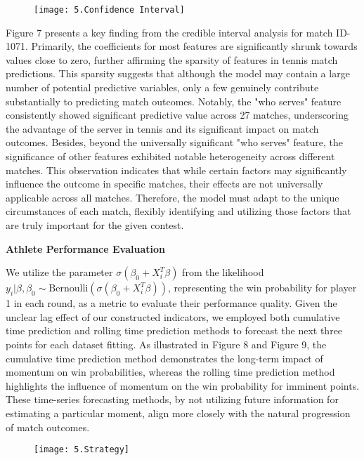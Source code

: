 \documentclass{mcmthesis}
\begin{document}
\begin{figure}[ht]
  \centering
  \texttt{[image: 5.Confidence Interval]}
\end{figure}

Figure 7 presents a key finding from the credible interval analysis for match ID-1071. Primarily, the coefficients for most features are significantly shrunk towards values close to zero, further affirming the sparsity of features in tennis match predictions. This sparsity suggests that although the model may contain a large number of potential predictive variables, only a few genuinely contribute substantially to predicting match outcomes. Notably, the "who serves" feature consistently showed significant predictive value across 27 matches, underscoring the advantage of the server in tennis and its significant impact on match outcomes. Besides, beyond the universally significant "who serves" feature, the significance of other features exhibited notable heterogeneity across different matches. This observation indicates that while certain factors may significantly influence the outcome in specific matches, their effects are not universally applicable across all matches. Therefore, the model must adapt to the unique circumstances of each match, flexibly identifying and utilizing those factors that are truly important for the given contest.

\textbf{Athlete Performance Evaluation}

We utilize the parameter $\sigma(\beta_0 + X_i^T\beta)$ from the likelihood $y_i | \beta, \beta_0 \sim \text{Bernoulli}\left(\sigma(\beta_0 + X_i^T\beta)\right)$, representing the win probability for player 1 in each round, as a metric to evaluate their performance quality. Given the unclear lag effect of our constructed indicators, we employed both cumulative time prediction and rolling time prediction methods to forecast the next three points for each dataset fitting. As illustrated in Figure 8 and Figure 9, the cumulative time prediction method demonstrates the long-term impact of momentum on win probabilities, whereas the rolling time prediction method highlights the influence of momentum on the win probability for imminent points. These time-series forecasting methods, by not utilizing future information for estimating a particular moment, align more closely with the natural progression of match outcomes.
\begin{figure}[ht]
  \small
  \centering
  \texttt{[image: 5.Strategy]}
\end{figure}
\end{document}
